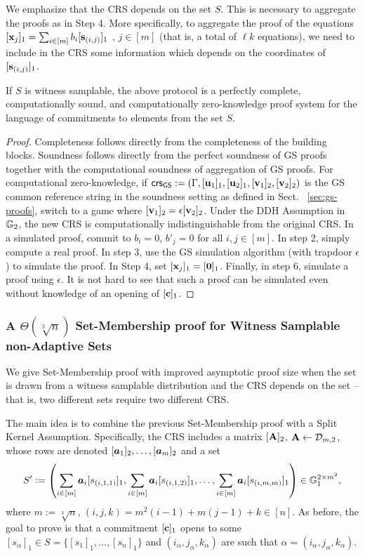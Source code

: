 We emphasize that the CRS depends on the set $S$. This is necessary to aggregate the proofs as in Step 4. More  specifically, to aggregate the proof of the equations  $[\mathbf{x}_j]_1 = \sum_{i\in[m]}b_i [\mathbf{s}_{(i,j)}]_1$ , $j\in[m]$ (that is, a total of $\ell k$ equations), we need to include in the CRS some information which depends on the coordinates of $[\mathbf{s}_{(i,j)}]_1$.

\begin{theorem}\label{theo:listsquarevect}
If $S$ is witness samplable, the above protocol is a perfectly complete, computationally sound, and computationally zero-knowledge proof system for the language of commitments to elements from the set $S$.
\end{theorem}

\begin{proof} Completeness follows directly from the completeness of the 
building blocks. Soundness follows directly from the perfect soundness of GS proofs together with the computational soundness of aggregation of GS proofs. For computational zero-knowledge, if  
$\mathsf{crs}_{\mathsf{GS}}:=(\Gamma,[\mathbf{u}_1]_1,[\mathbf{u}_2]_1,[\mathbf{v}_1]_2,[\mathbf{v}_2]_2)$ is the GS common reference string in the soundness setting as defined in Sect.~ \ref{sec:gs-proofs}, switch to a game where $[\mathbf{v}_1]_2= \epsilon [\mathbf{v}_2]_2$. Under the DDH Assumption in $\mathbb{G}_2$, the new CRS is computationally indistinguishable from the original CRS. In a simulated proof, commit to $b_i=0$, $b'_j=0$ for all $i,j \in [m]$. In step 2, simply compute a real proof. In step 3, use the GS simulation algorithm  (with trapdoor $\epsilon$) to simulate the proof. In Step 4, set $[\mathbf{x}_j]_1=[\mathbf{0}]_1$. Finally, in step 6, simulate a proof using $\epsilon$. It is not hard to see that such a proof can be simulated even without knowledge of an opening of $[\mathbf{c}]_1$. 
\end{proof}

\subsubsection{A $\Theta(\sqrt[3]{n})$ Set-Membership proof for Witness Samplable non-Adaptive Sets} We give Set-Membership proof with improved asymptotic proof size when the set is drawn from a witness samplable distribution and the CRS depends on the set --that is, two different sets require two different CRS.

The main idea is to combine the previous Set-Membership proof with a Split Kernel Assumption. Specifically, the CRS includes a matrix $[\mathbf{{A}}]_2$, $\mathbf{{A}} \gets\mathcal{D}_{m,2}$, whose rows are denoted $[{\boldsymbol a}_1]_2,\ldots,[{\boldsymbol a}_m]_2$ and a set 
$$S':=\left(\sum_{i\in[m]}{\boldsymbol a}_i[s_{(i,1,1)}]_1,\sum_{i\in[m]}{\boldsymbol a}_i[s_{(i,1,2)}]_1,\ldots,\sum_{i\in[m]}{\boldsymbol a}_i[s_{(i,m,m)}]_1\right)\in\mathbb{G}_1^{2\times m^2},$$
where $m:=\sqrt[3]{n}$, $(i,j,k)=m^2(i-1)+m(j-1)+k\in[n]$. As before, the goal to prove is that a commitment $[\mathbf{c}]_1$ opens to some $[s_{\alpha}]_1 \in S=\{[s_1]_1,\ldots,[s_n]_1\}$ and  $(i_{\alpha},j_{\alpha},k_{\alpha})$ are such that $\alpha=(i_{\alpha},j_{\alpha},k_{\alpha})$.

